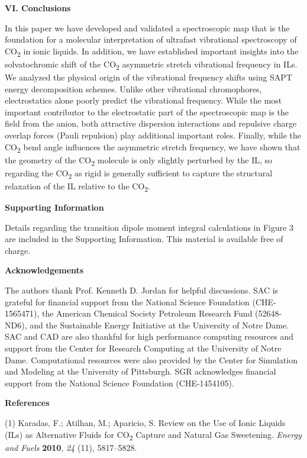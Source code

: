 \documentclass[]{article}
\begin{document}
\textbf{VI. Conclusions}

In this paper we have developed and validated a spectroscopic map that is the foundation for a molecular interpretation of ultrafast vibrational spectroscopy of CO\textsubscript{2} in ionic liquids. In addition, we have established important insights into the solvatochromic shift of the CO\textsubscript{2} asymmetric stretch vibrational frequency in ILs. We analyzed the physical origin of the vibrational frequency shifts using SAPT energy decomposition schemes. Unlike other vibrational chromophores, electrostatics alone poorly predict the vibrational frequency. While the most important contributor to the electrostatic part of the spectroscopic map is the field from the anion, both attractive dispersion interactions and repulsive charge overlap forces (Pauli repulsion) play additional important roles. Finally, while the CO\textsubscript{2} bend angle influences the asymmetric stretch frequency, we have shown that the geometry of the CO\textsubscript{2} molecule is only slightly perturbed by the IL, so regarding the CO\textsubscript{2} as rigid is generally sufficient to capture the structural relaxation of the IL relative to the CO\textsubscript{2}.

\textbf{Supporting Information}

Details regarding the transition dipole moment integral calculations in Figure 3 are included in the Supporting Information. This material is available free of charge.

\textbf{Acknowledgements}

The authors thank Prof. Kenneth D. Jordan for helpful discussions. SAC is grateful for financial support from the National Science Foundation (CHE-1565471), the American Chemical Society Petroleum Research Fund (52648-ND6), and the Sustainable Energy Initiative at the University of Notre Dame. SAC and CAD are also thankful for high performance computing resources and support from the Center for Research Computing at the University of Notre Dame. Computational resources were also provided by the Center for Simulation and Modeling at the University of Pittsburgh.  SGR acknowledges financial support from the National Science Foundation (CHE-1454105).

\textbf{References}

(1) Karadas, F.; Atilhan, M.; Aparicio, S. Review on the Use of Ionic
Liquids (ILs) as Alternative Fluids for CO\textsubscript{2} Capture and
Natural Gas Sweetening. \emph{Energy and Fuels} \textbf{2010}, \emph{24}
(11), 5817--5828.
\end{document}

